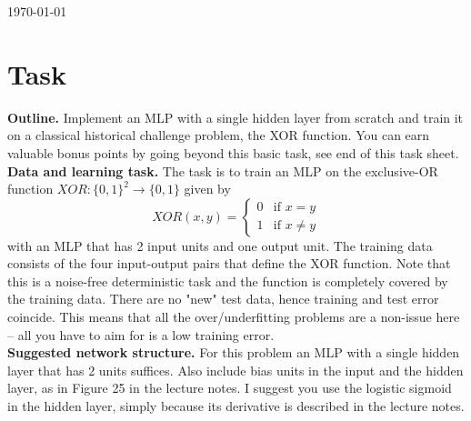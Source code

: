 \documentclass[12pt]{article}
\begin{document}
\begin{titlepage}

{\large \today}\\[2cm]


 

\vfill

\end{titlepage}



\section{Task}

\textbf{Outline.} Implement an MLP with a single hidden layer from scratch and train it on a classical historical challenge problem, the XOR function. You can earn valuable bonus points by going beyond this basic task, see end of this task sheet.\\

\noindent
\textbf{Data and learning task.} The task is to train an MLP on the exclusive-OR function $XOR: \{0, 1\}^2 \rightarrow \{0, 1\}$ given by 
\begin{equation}
	XOR(x,y) = \begin{cases}
		0 & \text{if } x = y\\
		1 & \text{if } x \neq y
	\end{cases}
\end{equation} 
with an MLP that has 2 input units and one output unit. The training data consists of the four input-output pairs that define the XOR function. Note that this is a noise-free deterministic task and the function is completely covered by the training data. There are no "new" test data, hence training and test error coincide. This means that all the over/underfitting problems are a non-issue here – all you have to aim for is a low training error.\\

\noindent
\textbf{Suggested network structure.} For this problem an MLP with a single hidden layer that has 2 units suffices. Also include bias units in the input and the hidden layer, as in Figure 25 in the lecture notes. I suggest you use the logistic sigmoid in the hidden layer, simply because its derivative is described in the lecture notes.\\
\end{document}
